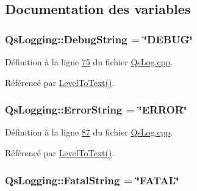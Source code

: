 \subsection{Documentation des variables}
\hypertarget{namespaceQsLogging_a961ecb32f941957f4fb2ce0e244e1dc0}{
\subsubsection[{Debug\-String}]{\setlength{\rightskip}{0pt plus 5cm}Qs\-Logging\-::\-Debug\-String = \char`\"{}D\-E\-B\-U\-G\char`\"{}\hspace{0.3cm}{\ttfamily [static]}}}\label{namespaceQsLogging_a961ecb32f941957f4fb2ce0e244e1dc0}


Définition à la ligne \hyperlink{QsLog_8cpp_source_l00075}{75} du fichier \hyperlink{QsLog_8cpp_source}{Qs\-Log.\-cpp}.



Référencé par \hyperlink{namespaceQsLogging_a8e669585768b47ba483f7325c18d60b8}{Level\-To\-Text()}.

\hypertarget{namespaceQsLogging_a81932d0d90f858336dcae9ea81560f51}{
\subsubsection[{Error\-String}]{\setlength{\rightskip}{0pt plus 5cm}Qs\-Logging\-::\-Error\-String = \char`\"{}E\-R\-R\-O\-R\char`\"{}\hspace{0.3cm}{\ttfamily [static]}}}\label{namespaceQsLogging_a81932d0d90f858336dcae9ea81560f51}


Définition à la ligne \hyperlink{QsLog_8cpp_source_l00087}{87} du fichier \hyperlink{QsLog_8cpp_source}{Qs\-Log.\-cpp}.



Référencé par \hyperlink{namespaceQsLogging_a8e669585768b47ba483f7325c18d60b8}{Level\-To\-Text()}.

\hypertarget{namespaceQsLogging_a6664814676313b529499e9590ed1c476}{
\subsubsection[{Fatal\-String}]{\setlength{\rightskip}{0pt plus 5cm}Qs\-Logging\-::\-Fatal\-String = \char`\"{}F\-A\-T\-A\-L\char`\"{}\hspace{0.3cm}{\ttfamily [static]}}}\label{namespaceQsLogging_a6664814676313b529499e9590ed1c476}


